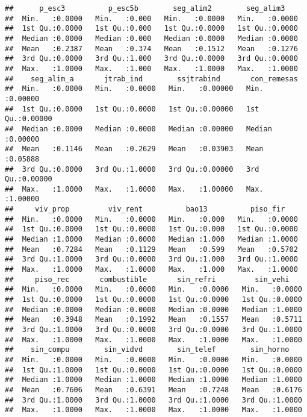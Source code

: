 \documentclass[11pt,]{article}
\begin{document}
\begin{verbatim}
##      p_esc3          p_esc5b        seg_alim2        seg_alim3     
##  Min.   :0.0000   Min.   :0.000   Min.   :0.0000   Min.   :0.0000  
##  1st Qu.:0.0000   1st Qu.:0.000   1st Qu.:0.0000   1st Qu.:0.0000  
##  Median :0.0000   Median :0.000   Median :0.0000   Median :0.0000  
##  Mean   :0.2387   Mean   :0.374   Mean   :0.1512   Mean   :0.1276  
##  3rd Qu.:0.0000   3rd Qu.:1.000   3rd Qu.:0.0000   3rd Qu.:0.0000  
##  Max.   :1.0000   Max.   :1.000   Max.   :1.0000   Max.   :1.0000  
##    seg_alim_a       jtrab_ind        ssjtrabind       con_remesas     
##  Min.   :0.0000   Min.   :0.0000   Min.   :0.00000   Min.   :0.00000  
##  1st Qu.:0.0000   1st Qu.:0.0000   1st Qu.:0.00000   1st Qu.:0.00000  
##  Median :0.0000   Median :0.0000   Median :0.00000   Median :0.00000  
##  Mean   :0.1146   Mean   :0.2629   Mean   :0.03903   Mean   :0.05888  
##  3rd Qu.:0.0000   3rd Qu.:1.0000   3rd Qu.:0.00000   3rd Qu.:0.00000  
##  Max.   :1.0000   Max.   :1.0000   Max.   :1.00000   Max.   :1.00000  
##     viv_prop         viv_rent          bao13          piso_fir     
##  Min.   :0.0000   Min.   :0.0000   Min.   :0.000   Min.   :0.0000  
##  1st Qu.:0.0000   1st Qu.:0.0000   1st Qu.:0.000   1st Qu.:0.0000  
##  Median :1.0000   Median :0.0000   Median :1.000   Median :1.0000  
##  Mean   :0.7284   Mean   :0.1129   Mean   :0.599   Mean   :0.5702  
##  3rd Qu.:1.0000   3rd Qu.:0.0000   3rd Qu.:1.000   3rd Qu.:1.0000  
##  Max.   :1.0000   Max.   :1.0000   Max.   :1.000   Max.   :1.0000  
##     piso_rec       combustible       sin_refri         sin_vehi     
##  Min.   :0.0000   Min.   :0.0000   Min.   :0.0000   Min.   :0.0000  
##  1st Qu.:0.0000   1st Qu.:0.0000   1st Qu.:0.0000   1st Qu.:0.0000  
##  Median :0.0000   Median :0.0000   Median :0.0000   Median :1.0000  
##  Mean   :0.3948   Mean   :0.1992   Mean   :0.1557   Mean   :0.5711  
##  3rd Qu.:1.0000   3rd Qu.:0.0000   3rd Qu.:0.0000   3rd Qu.:1.0000  
##  Max.   :1.0000   Max.   :1.0000   Max.   :1.0000   Max.   :1.0000  
##    sin_compu        sin_vidvd        sin_telef        sin_horno     
##  Min.   :0.0000   Min.   :0.0000   Min.   :0.0000   Min.   :0.0000  
##  1st Qu.:1.0000   1st Qu.:0.0000   1st Qu.:0.0000   1st Qu.:0.0000  
##  Median :1.0000   Median :1.0000   Median :1.0000   Median :1.0000  
##  Mean   :0.7606   Mean   :0.6391   Mean   :0.7248   Mean   :0.6176  
##  3rd Qu.:1.0000   3rd Qu.:1.0000   3rd Qu.:1.0000   3rd Qu.:1.0000  
##  Max.   :1.0000   Max.   :1.0000   Max.   :1.0000   Max.   :1.0000
\end{verbatim}
\end{document}
